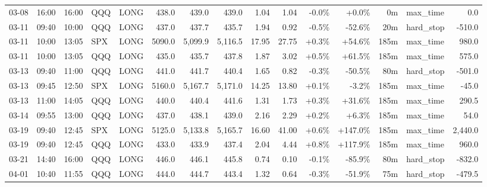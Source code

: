 \documentclass[11pt,a4paper,twoside]{article}
\begin{document}
\begin{landscape}
\begin{center}
\begin{longtable}{>{\color{txtmain}}l l l l l r r r r r r r r >{\color{txtmain}}l r}
03-08 & 16:00 & 16:00 & QQQ & LONG & 438.0 & 439.0 & 439.0 & 1.04 & 1.04 & \textcolor{lossred}{-0.0\%} & \textcolor{wingreen}{+0.0\%} & 0m & max\_time & \textcolor{wingreen}{0.0} \\
03-11 & 09:40 & 10:00 & QQQ & LONG & 437.0 & 437.7 & 435.7 & 1.94 & 0.92 & \textcolor{lossred}{-0.5\%} & \textcolor{lossred}{-52.6\%} & 20m & hard\_stop & \textcolor{lossred}{-510.0} \\
03-11 & 10:00 & 13:05 & SPX & LONG & 5090.0 & 5,099.9 & 5,116.5 & 17.95 & 27.75 & \textcolor{wingreen}{+0.3\%} & \textcolor{wingreen}{+54.6\%} & 185m & max\_time & \textcolor{wingreen}{980.0} \\
03-11 & 10:00 & 13:05 & QQQ & LONG & 435.0 & 435.7 & 437.8 & 1.87 & 3.02 & \textcolor{wingreen}{+0.5\%} & \textcolor{wingreen}{+61.5\%} & 185m & max\_time & \textcolor{wingreen}{575.0} \\
03-13 & 09:40 & 11:00 & QQQ & LONG & 441.0 & 441.7 & 440.4 & 1.65 & 0.82 & \textcolor{lossred}{-0.3\%} & \textcolor{lossred}{-50.5\%} & 80m & hard\_stop & \textcolor{lossred}{-501.0} \\
03-13 & 09:45 & 12:50 & SPX & LONG & 5160.0 & 5,167.7 & 5,171.0 & 14.25 & 13.80 & \textcolor{wingreen}{+0.1\%} & \textcolor{lossred}{-3.2\%} & 185m & max\_time & \textcolor{lossred}{-45.0} \\
03-13 & 11:00 & 14:05 & QQQ & LONG & 440.0 & 440.4 & 441.6 & 1.31 & 1.73 & \textcolor{wingreen}{+0.3\%} & \textcolor{wingreen}{+31.6\%} & 185m & max\_time & \textcolor{wingreen}{290.5} \\
03-14 & 09:55 & 13:00 & QQQ & LONG & 437.0 & 438.1 & 439.0 & 2.16 & 2.29 & \textcolor{wingreen}{+0.2\%} & \textcolor{wingreen}{+6.3\%} & 185m & max\_time & \textcolor{wingreen}{54.0} \\
03-19 & 09:40 & 12:45 & SPX & LONG & 5125.0 & 5,133.8 & 5,165.7 & 16.60 & 41.00 & \textcolor{wingreen}{+0.6\%} & \textcolor{wingreen}{+147.0\%} & 185m & max\_time & \textcolor{wingreen}{2,440.0} \\
03-19 & 09:40 & 12:45 & QQQ & LONG & 433.0 & 433.9 & 437.4 & 2.04 & 4.44 & \textcolor{wingreen}{+0.8\%} & \textcolor{wingreen}{+117.9\%} & 185m & max\_time & \textcolor{wingreen}{960.0} \\
03-21 & 14:40 & 16:00 & QQQ & LONG & 446.0 & 446.1 & 445.8 & 0.74 & 0.10 & \textcolor{lossred}{-0.1\%} & \textcolor{lossred}{-85.9\%} & 80m & hard\_stop & \textcolor{lossred}{-832.0} \\
04-01 & 10:40 & 11:55 & QQQ & LONG & 444.0 & 444.7 & 443.4 & 1.32 & 0.64 & \textcolor{lossred}{-0.3\%} & \textcolor{lossred}{-51.9\%} & 75m & hard\_stop & \textcolor{lossred}{-479.5} \\

\end{longtable}
\end{center}
\end{landscape}
\end{document}
